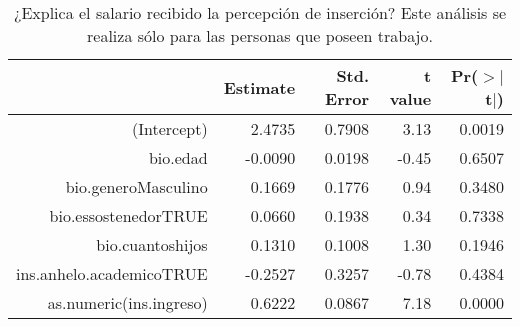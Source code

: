\begin{table}[ht]
\centering
\begin{tabular}{rrrrr}
  \hline
 & Estimate & Std. Error & t value & Pr($>$$|$t$|$) \\ 
  \hline
(Intercept) & 2.4735 & 0.7908 & 3.13 & 0.0019 \\ 
  bio.edad & -0.0090 & 0.0198 & -0.45 & 0.6507 \\ 
  bio.generoMasculino & 0.1669 & 0.1776 & 0.94 & 0.3480 \\ 
  bio.essostenedorTRUE & 0.0660 & 0.1938 & 0.34 & 0.7338 \\ 
  bio.cuantoshijos & 0.1310 & 0.1008 & 1.30 & 0.1946 \\ 
  ins.anhelo.academicoTRUE & -0.2527 & 0.3257 & -0.78 & 0.4384 \\ 
  as.numeric(ins.ingreso) & 0.6222 & 0.0867 & 7.18 & 0.0000 \\ 
   \hline
\end{tabular}
\caption{¿Explica el salario recibido la percepción de inserción? Este análisis se realiza sólo para las personas que poseen trabajo.} 
\label{tab:reg5}
\end{table}
